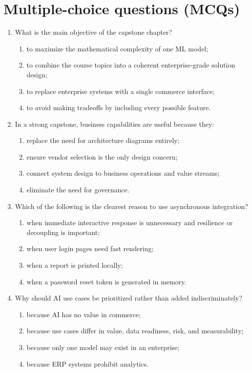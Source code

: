 \section{Multiple-choice questions (MCQs)}
\begin{enumerate}
  \item What is the main objective of the capstone chapter?
  \begin{enumerate}
    \item to maximize the mathematical complexity of one ML model;
    \item to combine the course topics into a coherent enterprise-grade solution design;
    \item to replace enterprise systems with a single commerce interface;
    \item to avoid making tradeoffs by including every possible feature.
  \end{enumerate}

  \item In a strong capstone, business capabilities are useful because they:
  \begin{enumerate}
    \item replace the need for architecture diagrams entirely;
    \item ensure vendor selection is the only design concern;
    \item connect system design to business operations and value streams;
    \item eliminate the need for governance.
  \end{enumerate}

  \item Which of the following is the clearest reason to use asynchronous integration?
  \begin{enumerate}
    \item when immediate interactive response is unnecessary and resilience or decoupling is important;
    \item when user login pages need fast rendering;
    \item when a report is printed locally;
    \item when a password reset token is generated in memory.
  \end{enumerate}

  \item Why should AI use cases be prioritized rather than added indiscriminately?
  \begin{enumerate}
    \item because AI has no value in commerce;
    \item because use cases differ in value, data readiness, risk, and measurability;
    \item because only one model may exist in an enterprise;
    \item because ERP systems prohibit analytics.
  \end{enumerate}


\end{enumerate}
